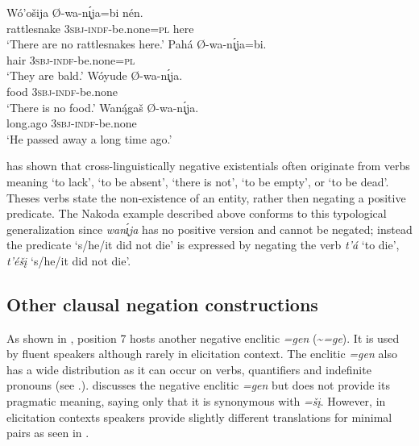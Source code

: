 \documentclass[output=paper,colorlinks,citecolor=brown]{langscibook}
\begin{document}
\ea\label{ex:nak:33}
    \ea\label{ex:nak:33a}
        \gll Wó’ošija Ø-wa-n\'{\k{ı}}ja=bi nén. \\ 
             rattlesnake \textsc{3sbj-indf}-be.none=\textsc{pl} here \\
        \glt ‘There are no rattlesnakes here.’
    \ex\label{ex:nak:33b}
        \gll Pahá Ø-wa-n\'{\k{ı}}ja=bi. \\
             hair \textsc{3sbj-indf}-be.none=\textsc{pl} \\
        \glt ‘They are bald.’
    \ex\label{ex:nak:33c}
        \gll Wóyude Ø-wa-n\'{\k{ı}}ja. \\
             food \textsc{3sbj-indf}-be.none \\
        \glt ‘There is no food.’
    \ex\label{ex:nak:33d}
        \gll Wan\'{ą}gaš Ø-wa-n\'{\k{ı}}ja. \\
             long.ago \textsc{3sbj-indf}-be.none\\
        \glt ‘He passed away a long time ago.’
    \z
\z 

\citet[137]{Veselinova2013neg.exist} has shown that cross-linguistically negative existentials often originate from verbs meaning ‘to lack’, ‘to be absent’, ‘there is not’, ‘to be empty’, or ‘to be dead’. Theses verbs state the non-existence of an entity, rather then negating a positive predicate. The Nakoda example described above conforms to this typological generalization since \textit{wan\'{\k{ı}}ja} has no positive version and cannot be negated; instead the predicate ‘s/he/it did not die’ is expressed by negating the verb \textit{t’á} ‘to die’, \textit{t’éšį} ‘s/he/it did not die’.

\newpage
\subsection{Other clausal negation constructions}\label{sec:nak:2.1.2}
    
As shown in , position 7 hosts another negative enclitic \textit{=gen} ({\textasciitilde}\textit{=ge}). It is used by fluent speakers although rarely in elicitation context. The enclitic \textit{=gen} also has a wide distribution as it can occur on verbs, quantifiers and indefinite pronouns (see .). \citet[321--322]{Cumberland2005} discusses the negative enclitic \textit{=gen} but does not provide its pragmatic meaning, saying only that it is synonymous with \textit{=šį}. However, in elicitation contexts speakers provide slightly different translations for minimal pairs as seen in .
\end{document}
